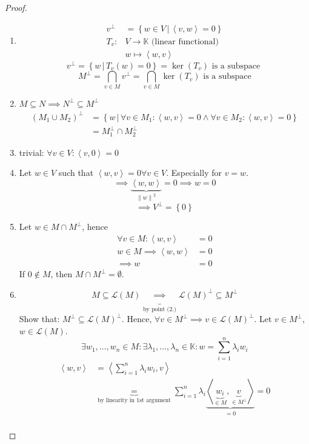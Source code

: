 \documentclass[a4paper]{article}
\numberwithin{lecref}{section}
\newcommand{\set}[1]{\left\{#1\right\}}
\newcommand{\setdef}[2]{\left\{\left.#1\,\right|\,#2\right\}}
\newcommand{\ip}[2]{\left\langle#1,#2\right\rangle} %
\newcommand{\norm}[1]{\left\|#1\right\|}
\begin{document}
\begin{proof}
  \begin{enumerate}
    \item
      \begin{align*}
        v^\bot &= \setdef{w \in V}{\ip vw = 0} \\
          T_v: & V \to \mathbb K \text{ (linear functional)} \\
               & w \mapsto \ip wv
      \end{align*}
      \[ v^\bot = \setdef{w}{T_v(w) = 0} = \ker(T_v) \text{ is a subspace } \]
      \[ M^\bot = \bigcap_{v \in M} v^\bot = \bigcap_{v \in M} \ker(T_v) \text{ is a subspace} \]
    \item
      $M \subseteq N \implies N^\bot \subseteq M^\bot$
      \begin{align*}
        (M_1 \cup M_2)^\bot
          &= \setdef{w}{\forall v \in M_1: \ip wv = 0 \land \forall v \in M_2: \ip wv = 0} \\
          &= M_1^\bot \cap M_2^\bot
      \end{align*}
    \item trivial: $\forall v \in V: \ip v0 = 0$
    \item Let $w \in V$ such that $\ip wv = 0 \forall v \in V$. Especially for $v = w$.
      \[ \implies \underbrace{\ip ww}_{\norm{w}^2} = 0 \implies w = 0 \]
      \[ \implies V^\bot = \set{0} \]
    \item
      Let $w \in M \cap M^\bot$, hence
      \begin{align*}
        \forall v \in M: \ip wv &= 0 \\
        w \in M \implies \ip ww &= 0 \\
        \implies w &= 0
      \end{align*}
      If $0 \not\in M$, then $M \cap M^\bot = \emptyset$.
    \item
      \[ M \subseteq \mathcal L(M) \underbrace{\implies}_{\text{by point (2.)}} \mathcal L(M)^\bot \subseteq M^\bot \]
      Show that: $M^\bot \subseteq \mathcal L(M)^\bot$.
      Hence, $\forall v \in M^\bot \implies v \in \mathcal L(M)^\bot$.
      Let $v \in M^\bot$, $w \in \mathcal L(M)$.
      \[
        \exists w_1, \ldots, w_n \in M: \exists \lambda_1, \ldots, \lambda_n \in \mathbb K:
        w = \sum_{i=1}^n \lambda_i w_i
      \]
      \begin{align*}
        \ip wv &= \ip{\sum_{i=1}^n \lambda_i w_i}{v} \\
               &\underbrace{=}_{\text{by linearity in 1st argument}} \sum_{i=1}^n \lambda_i \underbrace{\ip{\underbrace{w_i}_{\in M}}{\underbrace{v}_{\in M^\bot}}}_{= 0} = 0 \\

\end{align*}
\end{enumerate}
\end{proof}
\end{document}
